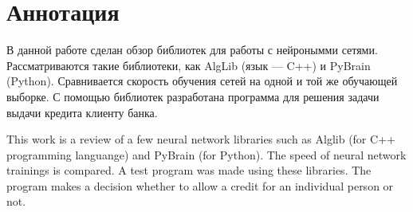 \section*{Аннотация}

В данной работе сделан обзор библиотек для работы с нейронымми сетями.
Рассматриваются такие библиотеки, как AlgLib (язык — C++) и PyBrain (Python).
Сравнивается скорость обучения сетей на одной и той же обучающей выборке.  С
помощью библиотек разработана программа для решения задачи выдачи кредита
клиенту банка.

This work is a review of a few neural network libraries such as Alglib (for C++
programming languange) and PyBrain (for Python). The speed of neural network
trainings is compared. A test program was made using these libraries. The
program makes a decision whether to allow a credit for an individual person or
not.

\newpage
{}

